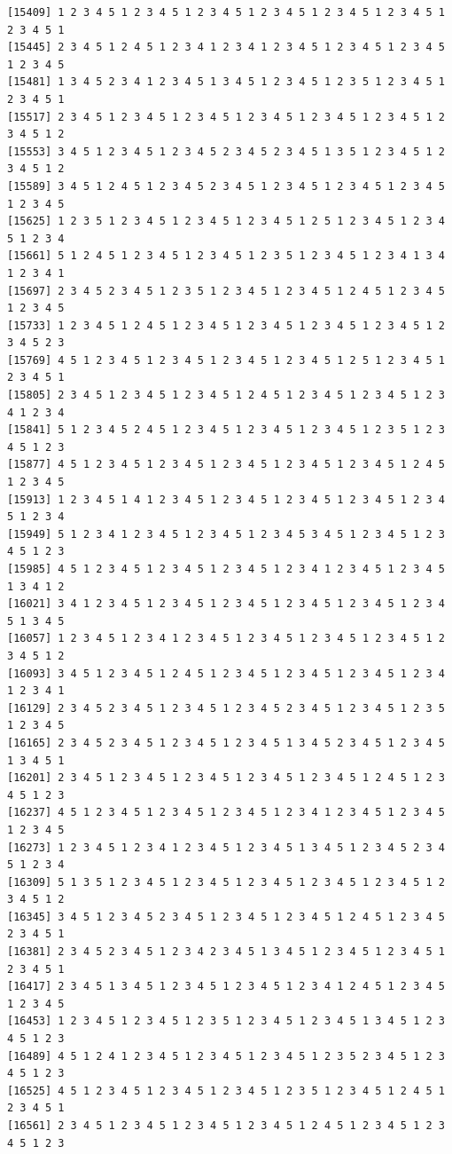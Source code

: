 \documentclass[
  english,
]{book}
\begin{document}
\begin{verbatim}
[15409] 1 2 3 4 5 1 2 3 4 5 1 2 3 4 5 1 2 3 4 5 1 2 3 4 5 1 2 3 4 5 1 2 3 4 5 1
[15445] 2 3 4 5 1 2 4 5 1 2 3 4 1 2 3 4 1 2 3 4 5 1 2 3 4 5 1 2 3 4 5 1 2 3 4 5
[15481] 1 3 4 5 2 3 4 1 2 3 4 5 1 3 4 5 1 2 3 4 5 1 2 3 5 1 2 3 4 5 1 2 3 4 5 1
[15517] 2 3 4 5 1 2 3 4 5 1 2 3 4 5 1 2 3 4 5 1 2 3 4 5 1 2 3 4 5 1 2 3 4 5 1 2
[15553] 3 4 5 1 2 3 4 5 1 2 3 4 5 2 3 4 5 2 3 4 5 1 3 5 1 2 3 4 5 1 2 3 4 5 1 2
[15589] 3 4 5 1 2 4 5 1 2 3 4 5 2 3 4 5 1 2 3 4 5 1 2 3 4 5 1 2 3 4 5 1 2 3 4 5
[15625] 1 2 3 5 1 2 3 4 5 1 2 3 4 5 1 2 3 4 5 1 2 5 1 2 3 4 5 1 2 3 4 5 1 2 3 4
[15661] 5 1 2 4 5 1 2 3 4 5 1 2 3 4 5 1 2 3 5 1 2 3 4 5 1 2 3 4 1 3 4 1 2 3 4 1
[15697] 2 3 4 5 2 3 4 5 1 2 3 5 1 2 3 4 5 1 2 3 4 5 1 2 4 5 1 2 3 4 5 1 2 3 4 5
[15733] 1 2 3 4 5 1 2 4 5 1 2 3 4 5 1 2 3 4 5 1 2 3 4 5 1 2 3 4 5 1 2 3 4 5 2 3
[15769] 4 5 1 2 3 4 5 1 2 3 4 5 1 2 3 4 5 1 2 3 4 5 1 2 5 1 2 3 4 5 1 2 3 4 5 1
[15805] 2 3 4 5 1 2 3 4 5 1 2 3 4 5 1 2 4 5 1 2 3 4 5 1 2 3 4 5 1 2 3 4 1 2 3 4
[15841] 5 1 2 3 4 5 2 4 5 1 2 3 4 5 1 2 3 4 5 1 2 3 4 5 1 2 3 5 1 2 3 4 5 1 2 3
[15877] 4 5 1 2 3 4 5 1 2 3 4 5 1 2 3 4 5 1 2 3 4 5 1 2 3 4 5 1 2 4 5 1 2 3 4 5
[15913] 1 2 3 4 5 1 4 1 2 3 4 5 1 2 3 4 5 1 2 3 4 5 1 2 3 4 5 1 2 3 4 5 1 2 3 4
[15949] 5 1 2 3 4 1 2 3 4 5 1 2 3 4 5 1 2 3 4 5 3 4 5 1 2 3 4 5 1 2 3 4 5 1 2 3
[15985] 4 5 1 2 3 4 5 1 2 3 4 5 1 2 3 4 5 1 2 3 4 1 2 3 4 5 1 2 3 4 5 1 3 4 1 2
[16021] 3 4 1 2 3 4 5 1 2 3 4 5 1 2 3 4 5 1 2 3 4 5 1 2 3 4 5 1 2 3 4 5 1 3 4 5
[16057] 1 2 3 4 5 1 2 3 4 1 2 3 4 5 1 2 3 4 5 1 2 3 4 5 1 2 3 4 5 1 2 3 4 5 1 2
[16093] 3 4 5 1 2 3 4 5 1 2 4 5 1 2 3 4 5 1 2 3 4 5 1 2 3 4 5 1 2 3 4 1 2 3 4 1
[16129] 2 3 4 5 2 3 4 5 1 2 3 4 5 1 2 3 4 5 2 3 4 5 1 2 3 4 5 1 2 3 5 1 2 3 4 5
[16165] 2 3 4 5 2 3 4 5 1 2 3 4 5 1 2 3 4 5 1 3 4 5 2 3 4 5 1 2 3 4 5 1 3 4 5 1
[16201] 2 3 4 5 1 2 3 4 5 1 2 3 4 5 1 2 3 4 5 1 2 3 4 5 1 2 4 5 1 2 3 4 5 1 2 3
[16237] 4 5 1 2 3 4 5 1 2 3 4 5 1 2 3 4 5 1 2 3 4 1 2 3 4 5 1 2 3 4 5 1 2 3 4 5
[16273] 1 2 3 4 5 1 2 3 4 1 2 3 4 5 1 2 3 4 5 1 3 4 5 1 2 3 4 5 2 3 4 5 1 2 3 4
[16309] 5 1 3 5 1 2 3 4 5 1 2 3 4 5 1 2 3 4 5 1 2 3 4 5 1 2 3 4 5 1 2 3 4 5 1 2
[16345] 3 4 5 1 2 3 4 5 2 3 4 5 1 2 3 4 5 1 2 3 4 5 1 2 4 5 1 2 3 4 5 2 3 4 5 1
[16381] 2 3 4 5 2 3 4 5 1 2 3 4 2 3 4 5 1 3 4 5 1 2 3 4 5 1 2 3 4 5 1 2 3 4 5 1
[16417] 2 3 4 5 1 3 4 5 1 2 3 4 5 1 2 3 4 5 1 2 3 4 1 2 4 5 1 2 3 4 5 1 2 3 4 5
[16453] 1 2 3 4 5 1 2 3 4 5 1 2 3 5 1 2 3 4 5 1 2 3 4 5 1 3 4 5 1 2 3 4 5 1 2 3
[16489] 4 5 1 2 4 1 2 3 4 5 1 2 3 4 5 1 2 3 4 5 1 2 3 5 2 3 4 5 1 2 3 4 5 1 2 3
[16525] 4 5 1 2 3 4 5 1 2 3 4 5 1 2 3 4 5 1 2 3 5 1 2 3 4 5 1 2 4 5 1 2 3 4 5 1
[16561] 2 3 4 5 1 2 3 4 5 1 2 3 4 5 1 2 3 4 5 1 2 4 5 1 2 3 4 5 1 2 3 4 5 1 2 3

\end{verbatim}
\end{document}
